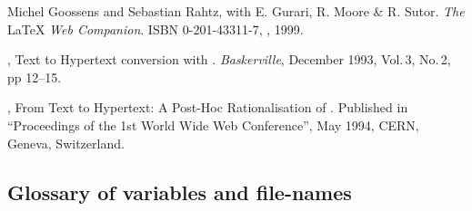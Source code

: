 \documentclass[dvips,a4paper]{article}
\begin{document}
\begin{thebibliography}{1}
%
%
%
\begin{htmlonly}
%
%
%
\end{htmlonly}
Michel Goossens and Sebastian Rahtz, with E. Gurari, R. Moore \& R. Sutor.
\newblock \emph{The }\LaTeX\emph{ Web Companion}.
\newblock ISBN 0-201-43311-7, \AddWes, 1999.

\NikosDrakos,
\newblock Text to Hypertext conversion with \latextohtml.
\newblock \textit{Baskerville}, December 1993, Vol.\,3, No.\,2, pp 12--15.

\NikosDrakos,
\newblock From Text to Hypertext: A Post-Hoc Rationalisation of \latextohtml.
\newblock Published in ``Proceedings of the 1st World Wide Web Conference'',
\newblock May 1994, CERN, Geneva, Switzerland.

\end{thebibliography}


%
%
%
%       
\begin{latexonly}
%
{}
\end{latexonly}

\begin{htmlonly}
\section{Glossary of variables and file-names\label{Glossary}}
\begin{htmllist}

\end{htmllist}
\end{htmlonly}
\end{document}
